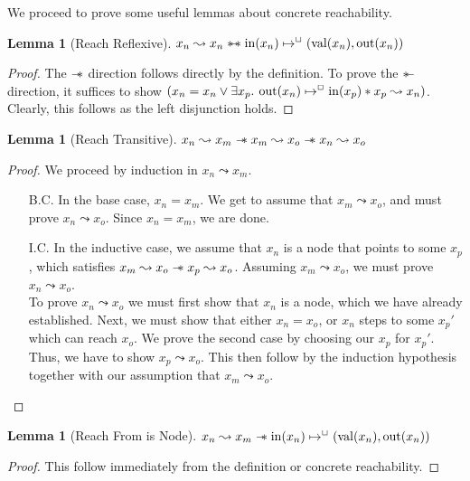 \documentclass[a4paper, 10pt]{report}
\theoremstyle{definition}
\newtheorem{lemma}[theorem]{Lemma}
\newcommand{\nIn}[1]{\operatorname{in}(#1)}
\newcommand{\nVal}[1]{\operatorname{val}(#1)}
\newcommand{\nOut}[1]{\operatorname{out}(#1)}
\newcommand{\node}{x}
\newcommand{\nodeM}[1]{\node_{#1}}
\newcommand{\isNode}[1]{\nIn{#1} \mapsto^{\persistently} (\nVal{#1}, \nOut{#1})}
\newcommand{\reach}[2]{#1 \leadsto #2}
\begin{document}
We proceed to prove some useful lemmas about concrete reachability.
\begin{lemma}[Reach Reflexive]\label{lemma:reach-reflexive}
  $\reach{\nodeM{n}}{\nodeM{n}} \wandIff \isNode{\nodeM{n}}$
\end{lemma}
\begin{proof}
  The $\mathrel{-\!\!*}$ direction follows directly by the definition. To prove the $\mathrel{*\!\!-}$ direction, it suffices to show $(\nodeM{n} = \nodeM{n} \lor{} \Exists \nodeM{p} . \nOut{\nodeM{n}} \mapsto^{\persistently} \nIn{\nodeM{p}} \star{} \reach{\nodeM{p}}{\nodeM{n}})$. Clearly, this follows as the left disjunction holds.
\end{proof}

\begin{lemma}[Reach Transitive]\label{lemma:reach-transitive}
  $\reach{\nodeM{n}}{\nodeM{m}} \wand \reach{\nodeM{m}}{\nodeM{o}} \wand \reach{\nodeM{n}}{\nodeM{o}}$
\end{lemma}
\begin{proof}
  We proceed by induction in $\reach{\nodeM{n}}{\nodeM{m}}$.
  \begin{itemize}
    \item[B.C.] In the base case, $\nodeM{n} = \nodeM{m}$. We get to assume that $\reach{\nodeM{m}}{\nodeM{o}}$, and must prove $\reach{\nodeM{n}}{\nodeM{o}}$. Since $\nodeM{n} = \nodeM{m}$, we are done.
    \item[I.C.] In the inductive case, we assume that $\nodeM{n}$ is a node that points to some $\nodeM{p}$, which satisfies $\reach{\nodeM{m}}{\nodeM{o}} \wand \reach{\nodeM{p}}{\nodeM{o}}$. Assuming $\reach{\nodeM{m}}{\nodeM{o}}$, we must prove $\reach{\nodeM{n}}{\nodeM{o}}$.\\
    To prove $\reach{\nodeM{n}}{\nodeM{o}}$ we must first show that $\nodeM{n}$ is a node, which we have already established. Next, we must show that either $\nodeM{n} = \nodeM{o}$, or $\nodeM{n}$ steps to some $\nodeM{p}'$ which can reach $\nodeM{o}$. We prove the second case by choosing our $\nodeM{p}$ for $\nodeM{p}'$. Thus, we have to show $\reach{\nodeM{p}}{\nodeM{o}}$. This then follow by the induction hypothesis together with our assumption that $\reach{\nodeM{m}}{\nodeM{o}}$.
  \end{itemize}
\end{proof}

\begin{lemma}[Reach From is Node]\label{lemma:reach-from-is-node}
  $\reach{\nodeM{n}}{\nodeM{m}} \wand \isNode{\nodeM{n}}$
\end{lemma}
\begin{proof}
  This follow immediately from the definition or concrete reachability.
\end{proof}
\end{document}
